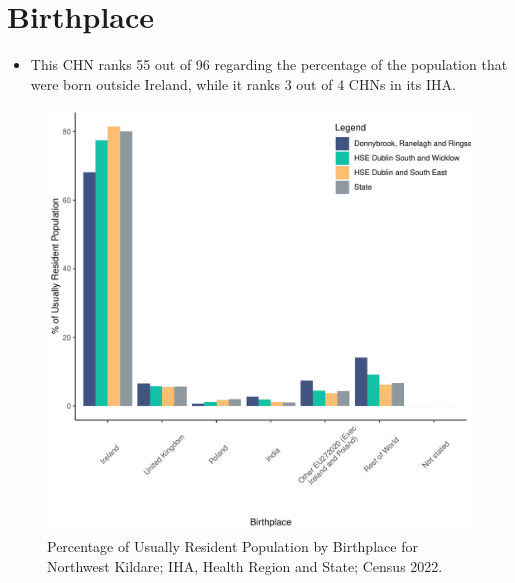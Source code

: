 \documentclass{article}
\begin{document}
\section{Birthplace}\label{sect:Birth}
\begin{itemize}
\item This CHN ranks  55 out of 96 regarding the percentage of the population that were born outside Ireland, while it ranks  3 out of 4 CHNs in its IHA.
\end{itemize}
\begin{figure}[H]
	\centering
	\includegraphics[width = 130mm]{../figures/BirthED.pdf}
	\caption{Percentage of Usually Resident Population by Birthplace for Northwest Kildare; IHA, Health Region and State; Census 2022.}
	\label{fig:vbnv}
	\end{figure}
	
\end{document}
